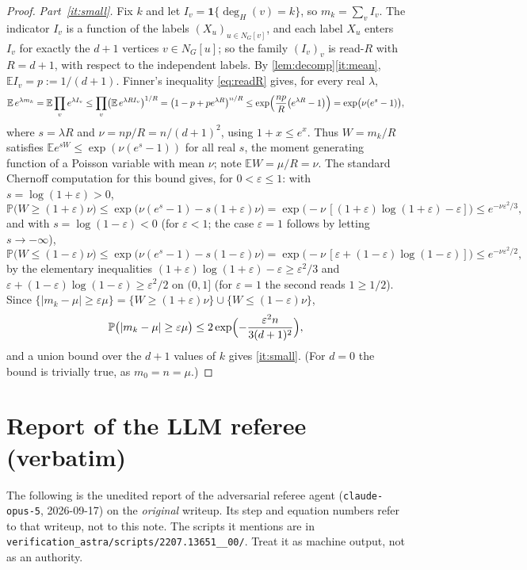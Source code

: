 \documentclass[11pt,a4paper]{article}
\theoremstyle{plain}
\theoremstyle{definition}
\theoremstyle{remark}
\newcommand{\EE}{\mathbb E}
\newcommand{\PP}{\mathbb P}
\newcommand{\ind}{\mathbf 1}
\newcommand{\degH}{\deg_H}
\begin{document}
\begin{proof}
\emph{Part~\ref{it:small}.} Fix $k$ and let $I_v=\ind\{\degH(v)=k\}$, so $m_k=\sum_vI_v$. The indicator $I_v$ is a function of the labels $(X_u)_{u\in N_G[v]}$, and each label $X_u$ enters $I_v$ for exactly the $d+1$ vertices $v\in N_G[u]$; so the family $(I_v)_v$ is read-$R$ with $R=d+1$, with respect to the independent labels. By \cref{lem:decomp}\ref{it:mean}, $\EE I_v=p:=1/(d+1)$. Finner's inequality \eqref{eq:readR} gives, for every real $\lambda$,
\[
 \EE\, e^{\lambda m_k}=\EE\prod_ve^{\lambda I_v}\le\prod_v\bigl(\EE\, e^{\lambda RI_v}\bigr)^{1/R}=\bigl(1-p+pe^{\lambda R}\bigr)^{n/R}\le\exp\Bigl(\frac{np}R\bigl(e^{\lambda R}-1\bigr)\Bigr)=\exp\bigl(\nu(e^{s}-1)\bigr),
\]
where $s=\lambda R$ and $\nu=np/R=n/(d+1)^2$, using $1+x\le e^x$. Thus $W=m_k/R$ satisfies $\EE e^{sW}\le\exp(\nu(e^s-1))$ for all real $s$, the moment generating function of a Poisson variable with mean $\nu$; note $\EE W=\mu/R=\nu$. The standard Chernoff computation for this bound gives, for $0<\varepsilon\le1$: with $s=\log(1+\varepsilon)>0$,
\[
 \PP\bigl(W\ge(1+\varepsilon)\nu\bigr)\le\exp\bigl(\nu(e^s-1)-s(1+\varepsilon)\nu\bigr)=\exp\bigl(-\nu\,[(1+\varepsilon)\log(1+\varepsilon)-\varepsilon]\bigr)\le e^{-\nu\varepsilon^2/3},
\]
and with $s=\log(1-\varepsilon)<0$ (for $\varepsilon<1$; the case $\varepsilon=1$ follows by letting $s\to-\infty$),
\[
 \PP\bigl(W\le(1-\varepsilon)\nu\bigr)\le\exp\bigl(\nu(e^s-1)-s(1-\varepsilon)\nu\bigr)=\exp\bigl(-\nu\,[\varepsilon+(1-\varepsilon)\log(1-\varepsilon)]\bigr)\le e^{-\nu\varepsilon^2/2},
\]
by the elementary inequalities $(1+\varepsilon)\log(1+\varepsilon)-\varepsilon\ge\varepsilon^2/3$ and $\varepsilon+(1-\varepsilon)\log(1-\varepsilon)\ge\varepsilon^2/2$ on $(0,1]$ (for $\varepsilon=1$ the second reads $1\ge1/2$). Since $\{|m_k-\mu|\ge\varepsilon\mu\}=\{W\ge(1+\varepsilon)\nu\}\cup\{W\le(1-\varepsilon)\nu\}$,
\[
 \PP\bigl(|m_k-\mu|\ge\varepsilon\mu\bigr)\le2\exp\Bigl(-\frac{\varepsilon^2n}{3(d+1)^2}\Bigr),
\]
and a union bound over the $d+1$ values of $k$ gives \ref{it:small}. (For $d=0$ the bound is trivially true, as $m_0=n=\mu$.)
\end{proof}

\section{Report of the LLM referee (verbatim)}\label{app:referee}

\begin{tcolorbox}[colback=gray!8,colframe=gray!50,boxrule=0.4pt,arc=2pt]
\small The following is the unedited report of the adversarial referee agent (\texttt{claude-opus-5}, 2026-09-17) on the \emph{original} writeup. Its step and equation numbers refer to that writeup, not to this note. The scripts it mentions are in \texttt{verification\_astra/scripts/2207.13651\_\_00/}. Treat it as machine output, not as an authority.
\end{tcolorbox}
\end{document}

